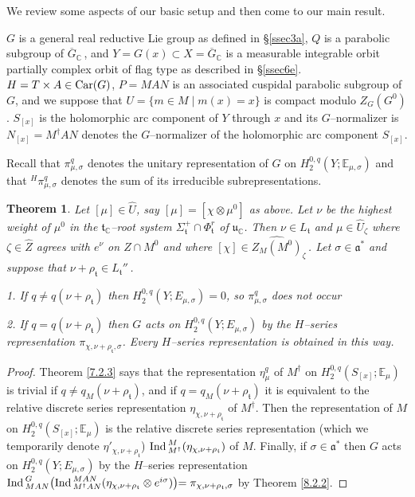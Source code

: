 \documentclass{conm-p-l}
\newtheorem{theorem}[equation]{Theorem}
\def\ga{\mathfrak{a}}
\def\gt{\mathfrak{t}}
\def\gu{\mathfrak{u}}
\def\Ind{{\rm Ind\,}}
\def\Car{{\rm Car}}
\def\C{\mathbb{C}}
\def\E{\mathbb{E}}
\begin{document}
We review some aspects of our basic setup and then come to our main result.

$G$ is a general real reductive Lie group as defined in 
{\rm \S \ref{ssec3a}}, $Q$ is a parabolic subgroup of $\overline{G}_\C$\,,
and $Y = G(x) \subset X = \overline{G}_\C$ is a measurable integrable orbit
partially complex orbit of flag type as described in {\rm \S \ref{ssec6e}}.  
$H = T\times A \in \Car(G)$, $P=MAN$ is an associated cuspidal 
parabolic subgroup of $G$, and we suppose that
$U = \{m \in M \mid m(x)=x\}$ is compact modulo $Z_G(G^0)$.
$S_{[x]}$ is the holomorphic arc component of $Y$ through $x$ and its
$G$--normalizer is $N_{[x]} = M^\dagger AN$ denotes the $G$--normalizer of 
the holomorphic arc component $S_{[x]}$. 

Recall that $\pi^q_{\mu,\sigma}$ denotes the unitary
representation of $G$ on  $H_2^{0,q}(Y;\E_{\mu,\sigma})$ and
that $^H\pi_{\mu,\sigma}^q$ denotes the sum of its irreducible 
subrepresentations.

\begin{theorem}\label{8.3.4}
Let $[\mu] \in \widehat{U}$, say $[\mu] = [\chi\otimes\mu^0]$ as above.
Let $\nu$ be the highest weight of $\mu^0$ in the $\gt_\C$--root system
$\Sigma_\gt^+\cap\Phi_\gt^r$ of $\gu_\C$.  Then $\nu \in L_\gt$ and
$\mu \in \widehat{U}_\zeta$ where $\zeta \in \widehat{Z}$ agrees with $e^\nu$ 
on $Z\cap M^0$ and where $[\chi] \in \widehat{Z_M(M^0)}_\zeta$\,.  
Let $\sigma \in \ga^*$ and suppose that $\nu + \rho_\gt \in L_\gt''$\,.  

{\rm 1.} If $q \ne q(\nu+\rho_\gt)$ then $H_2^{0,q}(Y;E_{\mu,\sigma}) = 0$,
so $\pi^q_{\mu,\sigma}$ does not occur

{\rm 2.} If  $q = q(\nu+\rho_\gt)$ then $G$ acts on
$H_2^{0,q}(Y;E_{\mu,\sigma})$ by the $H$--series representation
$\pi_{\chi,\nu + \rho_\gt, \sigma}$.  Every $H$--series representation
is obtained in this way.
\end{theorem}

\begin{proof}
Theorem \ref{7.2.3} says that the representation $\eta_\mu^q$ of $M^\dagger$ on
$H_2^{0,q}(S_{[x]};\E_\mu)$ is trivial if $q \ne q_M(\nu + \rho_\gt)$, and if 
$q = q_M(\nu + \rho_\gt)$ it is equivalent to the relative discrete series 
representation $\eta_{\chi,\nu + \rho_\gt}$ of $M^\dagger$.  Then the 
representation of $M$ on $H_2^{0,q}(S_{[x]};\E_\mu)$ is the relative
discrete series representation (which we temporarily denote 
$\eta'_{\chi,\nu + \rho_\gt}$) $\Ind_{M^\dagger}^M(\eta_{\chi,\nu + \rho_\gt})$
of $M$.  Finally, if $\sigma \in \ga^*$ then $G$ acts on 
$H_2^{0,q}(Y;E_{\mu,\sigma})$ by the $H$--series representation
$\Ind_{MAN}^G \bigr ( \Ind_{M^\dagger AN}^{MAN}
(\eta_{\chi,\nu + \rho_\gt}\otimes e^{i \sigma})\bigl ) =
\pi_{\chi,\nu + \rho_\gt, \sigma}$ by Theorem \ref{8.2.2}.
\end{proof}
\end{document}
